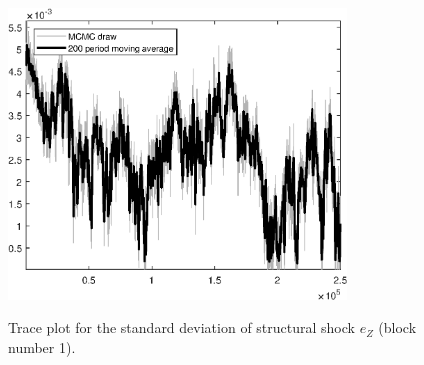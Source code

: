 \begin{figure}[H]
\centering
  \includegraphics[width=0.8\textwidth]{BRS_aggregate/graphs/TracePlot_SE_e_Z_blck_1}\\
    \caption{Trace plot for the standard deviation of structural shock ${e_Z}$ (block number 1).}
\end{figure}
